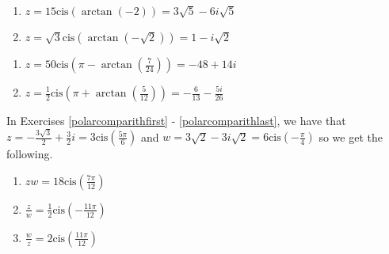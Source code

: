 \begin{multicols}{2} 

\begin{enumerate}

\setcounter{enumi}{\value{HW}}

\item $z = 15\text{cis}\left(\arctan\left(-2\right)\right) = 3\sqrt{5} -6i\sqrt{5}$ 
\item $z=  \sqrt{3}\text{cis}\left(\arctan\left(-\sqrt{2}\right)\right) = 1-i\sqrt{2}$

\setcounter{HW}{\value{enumi}}

\end{enumerate}

\end{multicols}

\begin{multicols}{2} 

\begin{enumerate}

\setcounter{enumi}{\value{HW}}

\item $z = 50\text{cis}\left(\pi-\arctan\left(\frac{7}{24}\right)\right) = -48 + 14i$ 
\item $z = \frac{1}{2}\text{cis}\left(\pi+\arctan\left(\frac{5}{12}\right)\right) = -\frac{6}{13} - \frac{5i}{26}$

\setcounter{HW}{\value{enumi}}

\end{enumerate}

\end{multicols}

\pagebreak

In Exercises \ref{polarcomparithfirst} - \ref{polarcomparithlast}, we have that $z = -\frac{3\sqrt{3}}{2} + \frac{3}{2}i = 3\text{cis}\left(\frac{5\pi}{6}\right)$ and $w = 3\sqrt{2} - 3i\sqrt{2} = 6\text{cis}\left(-\frac{\pi}{4}\right)$ so we get the following.  

\begin{multicols}{3}

\begin{enumerate}

\setcounter{enumi}{\value{HW}}

\item $zw = 18\text{cis}\left(\frac{7\pi}{12}\right)$
\item $\frac{z}{w} = \frac{1}{2}\text{cis}\left(-\frac{11\pi}{12}\right)$
\item $\frac{w}{z} = 2\text{cis}\left(\frac{11\pi}{12}\right)$

\setcounter{HW}{\value{enumi}}

\end{enumerate}

\end{multicols}


